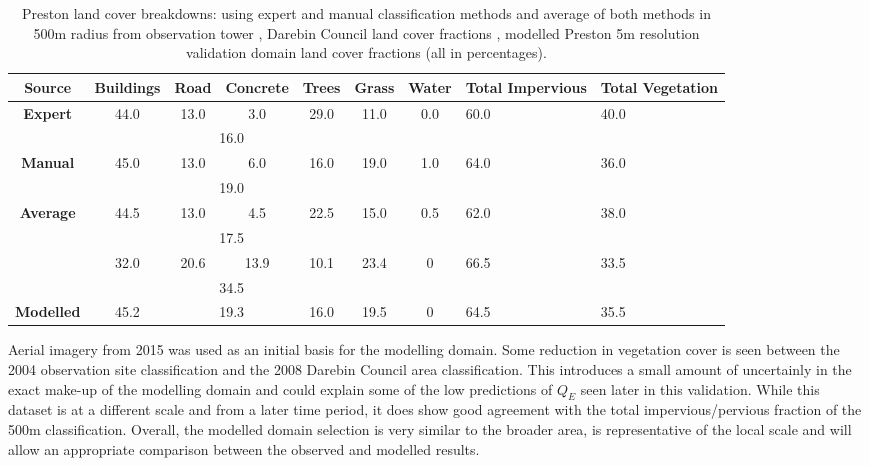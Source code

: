 \documentclass[final,3p,times,authoryear]{elsarticle}
\begin{document}
\begin{table}[!htbp]
\caption
{Preston land cover breakdowns: using expert and manual classification methods and average of both methods in 500m radius from observation tower \citep{Coutts2007}, Darebin Council land cover fractions \citep{Nury2015}, modelled Preston 5m resolution validation domain land cover fractions (all in percentages). \label{tab:expertValues}} 
  \begin{tabular}{ |c |c| c | c |c |c |c|p{1.65cm}|p{1.65cm}| } 
	\hline \textbf{Source}   & \textbf{Buildings}&	\textbf{Road}&\textbf{Concrete}	&\textbf{Trees}&\textbf{Grass}&\textbf{Water}&\textbf{Total Impervious}&\textbf{Total Vegetation} \\ \hline
 \textbf{Expert}&	44.0&	13.0&	3.0&	29.0&	11.0	&0.0	&	60.0&	40.0 \\ \hline 
 && \multicolumn{2}{|c|}{16.0} 	&&&&&\\ \hline  
 \textbf{Manual}&	45.0	&13.0	&6.0&	16.0&	19.0&	1.0&		64.0&	36.0 \\ \hline
 && \multicolumn{2}{|c|}{19.0} 	&&&&&\\ \hline 
 \textbf{Average} &	44.5&	13.0&	4.5&	22.5&	15.0&	0.5&		62.0&	38.0 \\ \hline
 && \multicolumn{2}{|c|}{17.5} 	&&&&&\\ \hline  
\textbf{\cite{Nury2015}}& 32.0&	20.6&	13.9&	10.1&	23.4&	0&		66.5&	33.5 \\ \hline
 & & \multicolumn{2}{|c|}{34.5} 	&&&&&\\ \hline	
\textbf{Modelled} & 45.2	& \multicolumn{2}{|c|}{19.3} & 16.0	& 19.5 &0& 64.5 &35.5 \\ \hline
  \end{tabular} 
 \end{table}  

Aerial imagery from 2015 \citep{GooglePreston2015} was used as an initial basis for the modelling domain. Some reduction in vegetation cover is seen between the 2004 observation site classification and the 2008 Darebin Council area classification. This introduces a small amount of uncertainly in the exact make-up of the modelling domain and could explain some of the low predictions of $Q_{E}$ seen later in this validation. While this dataset is at a different scale and from a later time period, it does show good agreement with the total impervious/pervious fraction of the 500m classification. Overall, the modelled domain selection is very similar to the broader area, is representative of the local scale and will allow an appropriate comparison between the observed and modelled results. 
\end{document}
